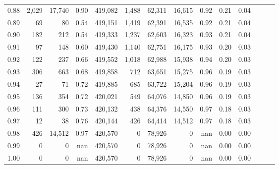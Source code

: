 \begin{tabular}{rrrrrrrrrrrrrr}
0.88 &   2,029 &  17,740 &  0.90 &  419,082 &    1,488 &  62,311 &  16,615 &  0.92 &  0.21 &      0.04 \\
0.89 &      69 &      80 &  0.54 &  419,151 &    1,419 &  62,391 &  16,535 &  0.92 &  0.21 &      0.04 \\
0.90 &     182 &     212 &  0.54 &  419,333 &    1,237 &  62,603 &  16,323 &  0.93 &  0.21 &      0.04 \\
0.91 &      97 &     148 &  0.60 &  419,430 &    1,140 &  62,751 &  16,175 &  0.93 &  0.20 &      0.03 \\
0.92 &     122 &     237 &  0.66 &  419,552 &    1,018 &  62,988 &  15,938 &  0.94 &  0.20 &      0.03 \\
0.93 &     306 &     663 &  0.68 &  419,858 &      712 &  63,651 &  15,275 &  0.96 &  0.19 &      0.03 \\
0.94 &      27 &      71 &  0.72 &  419,885 &      685 &  63,722 &  15,204 &  0.96 &  0.19 &      0.03 \\
0.95 &     136 &     354 &  0.72 &  420,021 &      549 &  64,076 &  14,850 &  0.96 &  0.19 &      0.03 \\
0.96 &     111 &     300 &  0.73 &  420,132 &      438 &  64,376 &  14,550 &  0.97 &  0.18 &      0.03 \\
0.97 &      12 &      38 &  0.76 &  420,144 &      426 &  64,414 &  14,512 &  0.97 &  0.18 &      0.03 \\
0.98 &     426 &  14,512 &  0.97 &  420,570 &        0 &  78,926 &       0 &   nan &  0.00 &      0.00 \\
0.99 &       0 &       0 &   nan &  420,570 &        0 &  78,926 &       0 &   nan &  0.00 &      0.00 \\
1.00 &       0 &       0 &   nan &  420,570 &        0 &  78,926 &       0 &   nan &  0.00 &      0.00 \\
\bottomrule
\end{tabular}
